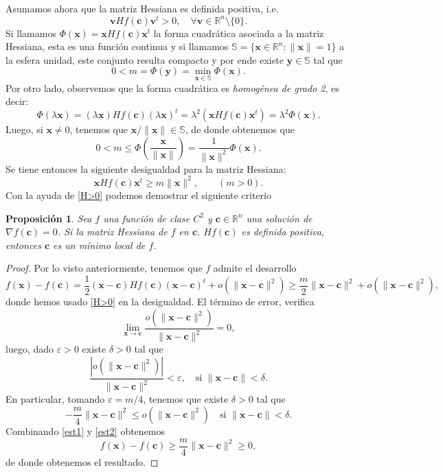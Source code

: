 \documentclass[12pt, a4paper]{amsbook}
\newcommand{\ve}{\varepsilon}
\newcommand{\R}{{\mathbb R}}
\newcommand{\Sb}{{\mathbb S}}
\newcommand{\vv}{{\mathbf v}}
\newcommand{\xx}{{\mathbf x}}
\newcommand{\yy}{{\mathbf y}}
\newcommand{\cc}{{\mathbf c}}
\newtheorem{prop}[teo]{Proposici\'on}
\theoremstyle{remark}
\theoremstyle{definition}
\numberwithin{section}{chapter}
\numberwithin{subsection}{section}
\numberwithin{equation}{section}
\numberwithin{figure}{chapter}
\begin{document}
Asumamos ahora que la matriz Hessiana es definida positiva, i.e.
$$
\vv Hf(\cc)\vv^t>0,\quad \forall \vv\in \R^n\setminus \{0\}.
$$
Si llamamos $\Phi(\xx) = \xx Hf(\cc)\xx^t$ la forma cuadrática asociada a la matriz Hessiana, esta es una función continua y si llamamos $\Sb=\{\xx\in\R^n\colon \|\xx\|=1\}$ a la esfera unidad, este conjunto resulta compacto y por ende existe $\yy\in \Sb$ tal que
$$
0<m=\Phi(\yy) = \min_{\xx\in \Sb}\Phi(\xx).
$$
Por otro lado, observemos que la forma cuadrática es {\em homogénea de grado 2}, es decir:
$$
\Phi(\lambda\xx) = (\lambda\xx)Hf(\cc)(\lambda\xx)^t = \lambda^2 (\xx Hf(\cc)\xx^t) = \lambda^2\Phi(\xx).
$$
Luego, si $\xx\neq 0$, tenemos que $\xx/\|\xx\|\in \Sb$, de donde obtenemos que
$$
0<m\le \Phi\left(\frac{\xx}{\|\xx\|}\right) = \frac{1}{\|\xx\|^2} \Phi(\xx).
$$
Se tiene entonces la siguiente desigualdad para la matriz Hessiana:
\begin{equation}\label{H>0}
\xx Hf(\cc)\xx^t\ge m \|\xx\|^2,\qquad (m>0).
\end{equation}
Con la ayuda de \eqref{H>0} podemos demostrar el siguiente criterio
\begin{prop}
Sea $f$ una función de clase $C^2$ y $\cc\in \R^n$ una solución de $\nabla f(\cc)=0$. Si la matriz Hessiana de $f$ en $\cc$. $Hf(\cc)$ es definida positiva, entonces $\cc$ es un mínimo local de $f$.
\end{prop}

\begin{proof}
Por lo visto anteriormente, tenemos que $f$ admite el desarrollo
\begin{equation}\label{est1}
f(\xx) - f(\cc) = \frac12 (\xx-\cc)Hf(\cc)(\xx-\cc)^t + o(\|\xx-\cc\|^2)\ge \frac{m}{2} \|\xx-\cc\|^2 + o(\|\xx-\cc\|^2),
\end{equation}
donde hemos usado \eqref{H>0} en la desigualdad. El término de error, verifica
$$
\lim_{\xx\to\cc} \frac{o(\|\xx-\cc\|^2)}{\|\xx-\cc\|^2} = 0,
$$
luego, dado $\ve>0$ existe $\delta>0$ tal que
$$
\frac{|o(\|\xx-\cc\|^2)|}{\|\xx-\cc\|^2}<\ve,\quad \text{si } \|\xx-\cc\|<\delta.
$$
En particular, tomando $\ve=m/4$, tenemos que existe $\delta>0$ tal que
\begin{equation}\label{est2}
-\frac{m}{4} \|\xx-\cc\|^2 \le o(\|\xx-\cc\|^2) \quad \text{si } \|\xx-\cc\|<\delta.
\end{equation}
Combinando \eqref{est1} y \eqref{est2} obtenemos
$$
f(\xx)-f(\cc) \ge \frac{m}{4} \|\xx-\cc\|^2\ge 0,
$$
de donde obtenemos el resultado.
\end{proof}
\end{document}
